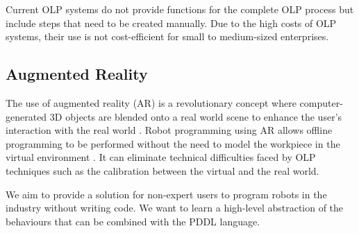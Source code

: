 Current OLP systems do not provide functions for the complete OLP process but include steps that need to be created manually. 
Due to the high costs of OLP systems, their use is not cost-efficient for small to medium-sized enterprises.

\subsection{Augmented Reality}\label{sssec:Augmented Reality}
The use of augmented reality (AR) is a revolutionary concept where computer-generated 3D objects are blended onto a real world scene to enhance the user's interaction with the real world \cite{pettersen2003augmented}. 
Robot programming using AR allows offline programming to be performed without the need to model the workpiece in the virtual environment \cite{pan2012recent}. 
It can eliminate technical difficulties faced by OLP techniques such as the calibration between the virtual and the real world.

We aim to provide a solution for non-expert users to program robots in the industry without writing code. 
We want to learn a high-level abstraction of the behaviours that can be combined with the PDDL language.


